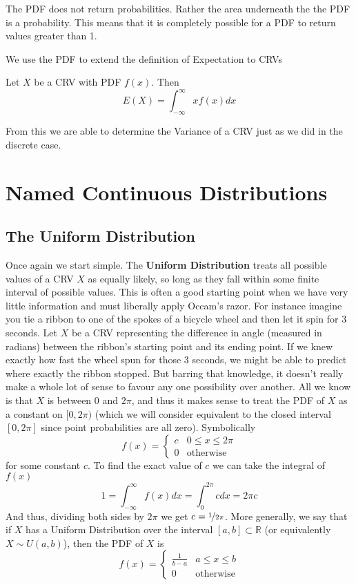 \documentclass{report}
\begin{document}
\begin{notsofast}
    The PDF does not return probabilities. Rather the area underneath the the PDF is a probability. This means that it is completely possible for a PDF to return values greater than 1.
\end{notsofast}

We use the PDF to extend the definition of Expectation to CRVs
\begin{definition}
Let $X$ be a CRV with PDF $f(x)$. Then
    \[
        E(X)=\int_{-\infty}^\infty x f(x) dx
    \]
\end{definition}
From this we are able to determine the Variance of a CRV just as we did in the discrete case.

\section{Named Continuous Distributions}
\subsection{The Uniform Distribution}
Once again we start simple. The \textbf{Uniform Distribution} treats all possible values of a CRV $X$ as equally likely, so long as they fall within some finite interval of possible values. This is often a good starting point when we have very little information and must liberally apply Occam's razor. For instance imagine you tie a ribbon to one of the spokes of a bicycle wheel and then let it spin for 3 seconds. Let $X$ be a CRV representing the difference in angle (measured in radians) between the ribbon's starting point and its ending point. If we knew exactly how fast the wheel spun for those 3 seconds, we might be able to predict where exactly the ribbon stopped. But barring that knowledge, it doesn't really make a whole lot of sense to favour any one possibility over another. All we know is that $X$ is between 0 and $2\pi$, and thus it makes sense to treat the PDF of $X$ as a constant on $[0,2\pi)$ (which we will consider equivalent to the closed interval $[0,2\pi]$ since point probabilities are all zero). Symbolically
\[
    f(x)=\begin{cases}
        c & 0\le x \le 2\pi
        \\
        0 & \text{otherwise}
    \end{cases}
\]
for some constant $c$. To find the exact value of $c$ we can take the integral of $f(x)$
\[
    1=\int_{-\infty}^\infty f(x)dx=\int_0^{2\pi} c dx=2\pi c
\]
And thus, dividing both sides by $2\pi$ we get $c=\nicefrac 1 {2\pi}$. More generally, we say that if $X$ has a Uniform Distribution over the interval $[a,b]\subset\mathbb R$ (or equivalently $X\sim U(a,b)$), then the PDF of $X$ is
\[
    f(x)=\begin{cases}
        \frac 1 {b-a} & a\le x \le b
        \\
        0 & \text{otherwise}
    \end{cases}
\]
\end{document}
